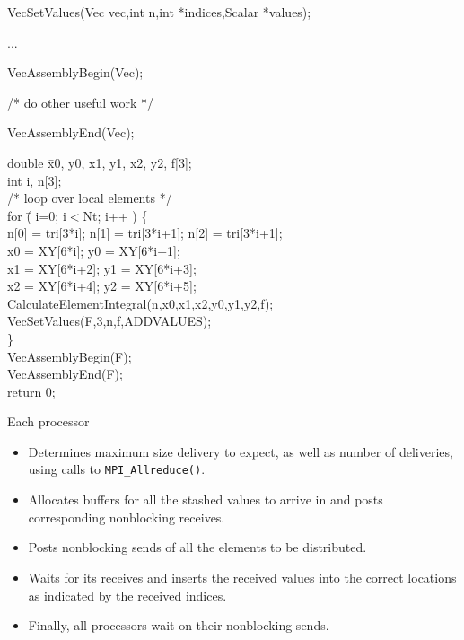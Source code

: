 VecSetValues(Vec vec,int n,int *indices,Scalar *values);

...

VecAssemblyBegin(Vec);

/* do other useful work */

VecAssemblyEnd(Vec);
\ve

{\small 
\begin{tabbing}
double \= x0, y0, x1, y1, x2, y2, f[3];\\
int \>  i, n[3];\\
         /* loop over local elements */\\
          for \=( i=0; i$<$Nt; i++ ) \{\\
    \>         n[0] = tri[3*i];  n[1] = tri[3*i+1];  n[2] = tri[3*i+1];\\
    \>         x0 = XY[6*i];     y0 = XY[6*i+1]; \\
    \>         x1 = XY[6*i+2];   y1 = XY[6*i+3]; \\
    \>         x2 = XY[6*i+4];   y2 = XY[6*i+5]; \\
   \>          CalculateElementIntegral(n,x0,x1,x2,y0,y1,y2,f);\\
   \>          VecSetValues(F,3,n,f,ADDVALUES);\\
          \}\\
           VecAssemblyBegin(F);\\
          VecAssemblyEnd(F);\\
          return 0;\\
\end{tabbing}}
\ve

Each processor
\begin{itemize}
\item Determines maximum size delivery to expect,
      as well as  number of deliveries, using
      calls to {\tt MPI\_Allreduce()}. 
\item Allocates buffers for all the stashed values
      to arrive in and posts corresponding nonblocking receives.
\item Posts nonblocking sends of all the elements to 
      be distributed.
\stripe
\item Waits for its receives and inserts the received 
      values into the correct locations as indicated by the received
      indices.
\item Finally, all processors wait on their nonblocking sends.
\end{itemize}

